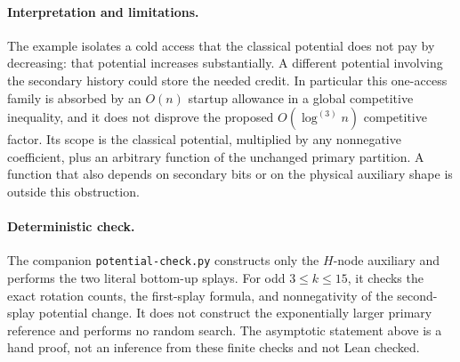 \documentclass[11pt]{article}
\begin{document}
\paragraph{Interpretation and limitations.}
The example isolates a cold access that the classical potential does
not pay by decreasing: that potential increases substantially. A
different potential involving the secondary history could store the
needed credit. In particular this one-access family is absorbed by an
$O(n)$ startup allowance in a global competitive inequality, and it
does not disprove the proposed $O(\log^{(3)}n)$ competitive factor.
Its scope is the classical potential, multiplied by any nonnegative
coefficient, plus an arbitrary function of the unchanged primary
partition. A function that also depends on secondary bits or on the
physical auxiliary shape is outside this obstruction.

\paragraph{Deterministic check.}
The companion \texttt{potential-check.py} constructs only the $H$-node
auxiliary and performs the two literal bottom-up splays. For odd
$3\le k\le15$, it checks the exact rotation counts, the first-splay
formula, and nonnegativity of the second-splay potential change. It
does not construct the exponentially larger primary reference and
performs no random search. The asymptotic statement above is a hand
proof, not an inference from these finite checks and not Lean checked.
\end{document}

